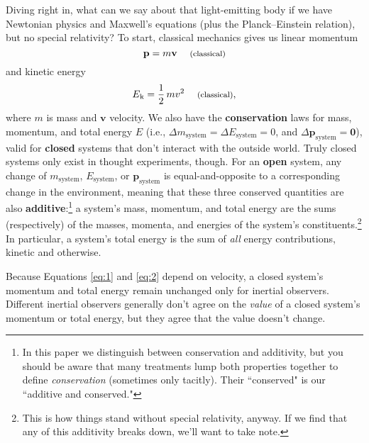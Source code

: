 \documentclass[12pt]{article}
\renewcommand{\vv}[1]{\mathbf{#1}}
\begin{document}
Diving right in, what can we say about that light-emitting body if we have Newtonian physics and Maxwell's equations (plus the Planck--Einstein relation), but no special relativity? To start, classical mechanics gives us linear momentum
\begin{equation}\label{eq:1}
\vv p=m\vv v \quad \text{\footnotesize{ (classical)}}
\end{equation}
and kinetic energy
\begin{equation}\label{eq:2}
E_{\mkern.5mu \textrm{k}}= \frac{1}{2} \, m v ^2 \quad \text{\footnotesize{ (classical)}},
\end{equation}
where $m$ is mass and $\vv{v}$ velocity. We also have the \textbf{conservation} laws for mass, momentum, and total energy $E$ (i.e., $\Delta m_{\mathrm{system}} = \Delta E_{\mathrm{system}} = 0$, and $\Delta \vv p_{\mathrm{system}} = \vv 0$), valid for \textbf{closed} systems that don't interact with the outside world. Truly closed systems only exist in thought experiments, though. For an \textbf{open} system, any change of $m_{\mathrm{system}}$, $E_{\mathrm{system}}$, or $\vv p_{\mathrm{system}}$ is equal-and-opposite to a corresponding change in the environment, meaning that these three conserved quantities are also \textbf{additive}:\footnote{In this paper we distinguish between conservation and additivity, but you should be aware that many treatments lump both properties together to define \emph{conservation} (sometimes only tacitly). Their ``conserved" is our ``additive and conserved."} a system's mass, momentum, and total energy are the sums (respectively) of the masses, momenta, and energies of the system's constituents.\footnote{\label{fn:ad}This is how things stand without special relativity, anyway. If we find that any of this additivity breaks down, we'll want to take note.} In particular, a system's total energy is the sum of \emph{all} energy contributions, kinetic and otherwise.

Because Equations \ref{eq:1} and \ref{eq:2} depend on velocity, a closed system's momentum and total energy remain unchanged only for inertial observers. Different inertial observers generally don't agree on the \emph{value} of a closed system's momentum or total energy, but they agree that the value doesn't change.
\end{document}
